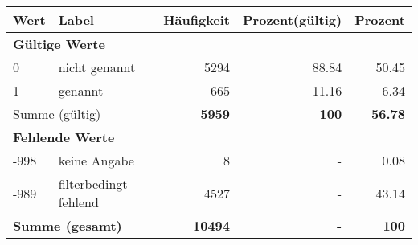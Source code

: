      \begin{longtable}{lXrrr}
     \toprule
     \textbf{Wert} & \textbf{Label} & \textbf{Häufigkeit} & \textbf{Prozent(gültig)} & \textbf{Prozent} \\
     \endhead
     \midrule
     \multicolumn{5}{l}{\textbf{Gültige Werte}}\\

     0 &
     \multicolumn{1}{X}{ nicht genannt   } &


       \num{5294} &
       \num[round-mode=places,round-precision=2]{88.84} &
         \num[round-mode=places,round-precision=2]{50.45} \\

     1 &
     \multicolumn{1}{X}{ genannt   } &


       \num{665} &
       \num[round-mode=places,round-precision=2]{11.16} &
         \num[round-mode=places,round-precision=2]{6.34} \\
     \midrule
     \multicolumn{2}{l}{Summe (gültig)} &
       \textbf{\num{5959}} &
     \textbf{\num{100}} &
       \textbf{\num[round-mode=places,round-precision=2]{56.78}} \\
     \multicolumn{5}{l}{\textbf{Fehlende Werte}}\\
       -998 &
       keine Angabe &
         \num{8} &
        - &
         \num[round-mode=places,round-precision=2]{0.08} \\
       -989 &
       filterbedingt fehlend &
         \num{4527} &
        - &
         \num[round-mode=places,round-precision=2]{43.14} \\
     \midrule
     \multicolumn{2}{l}{\textbf{Summe (gesamt)}} &
          \textbf{\num{10494}} &
        \textbf{-} &
        \textbf{\num{100}} \\
     \bottomrule
     \end{longtable}
     
